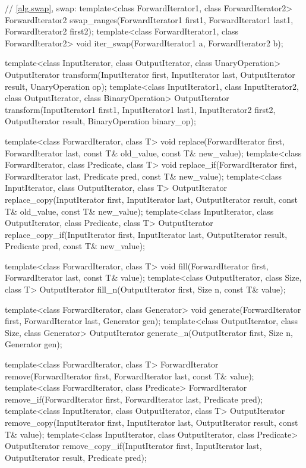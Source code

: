 \begin{codeblock}
{  // \ref{alg.swap}, swap:
  template<class ForwardIterator1, class ForwardIterator2>
    ForwardIterator2 swap_ranges(ForwardIterator1 first1,
    ForwardIterator1 last1, ForwardIterator2 first2);
  template<class ForwardIterator1, class ForwardIterator2>
    void iter_swap(ForwardIterator1 a, ForwardIterator2 b);

  template<class InputIterator, class OutputIterator, class UnaryOperation>
    OutputIterator transform(InputIterator first, InputIterator last,
                             OutputIterator result, UnaryOperation op);
  template<class InputIterator1, class InputIterator2, class OutputIterator,
     class BinaryOperation>
    OutputIterator transform(InputIterator1 first1, InputIterator1 last1,
                             InputIterator2 first2, OutputIterator result,
                             BinaryOperation binary_op);

  template<class ForwardIterator, class T>
    void replace(ForwardIterator first, ForwardIterator last,
                 const T& old_value, const T& new_value);
  template<class ForwardIterator, class Predicate, class T>
    void replace_if(ForwardIterator first, ForwardIterator last,
                    Predicate pred, const T& new_value);
  template<class InputIterator, class OutputIterator, class T>
    OutputIterator replace_copy(InputIterator first, InputIterator last,
                                OutputIterator result,
                                const T& old_value, const T& new_value);
  template<class InputIterator, class OutputIterator, class Predicate, class T>
    OutputIterator replace_copy_if(InputIterator first, InputIterator last,
                                   OutputIterator result,
                                   Predicate pred, const T& new_value);

  template<class ForwardIterator, class T>
    void fill(ForwardIterator first, ForwardIterator last, const T& value);
  template<class OutputIterator, class Size, class T>
    OutputIterator fill_n(OutputIterator first, Size n, const T& value);

  template<class ForwardIterator, class Generator>
    void generate(ForwardIterator first, ForwardIterator last,
                  Generator gen);
  template<class OutputIterator, class Size, class Generator>
    OutputIterator generate_n(OutputIterator first, Size n, Generator gen);

  template<class ForwardIterator, class T>
    ForwardIterator remove(ForwardIterator first, ForwardIterator last,
                           const T& value);
  template<class ForwardIterator, class Predicate>
    ForwardIterator remove_if(ForwardIterator first, ForwardIterator last,
                              Predicate pred);
  template<class InputIterator, class OutputIterator, class T>
    OutputIterator remove_copy(InputIterator first, InputIterator last,
                               OutputIterator result, const T& value);
  template<class InputIterator, class OutputIterator, class Predicate>
    OutputIterator remove_copy_if(InputIterator first, InputIterator last,
                                  OutputIterator result, Predicate pred);

}
\end{codeblock}
